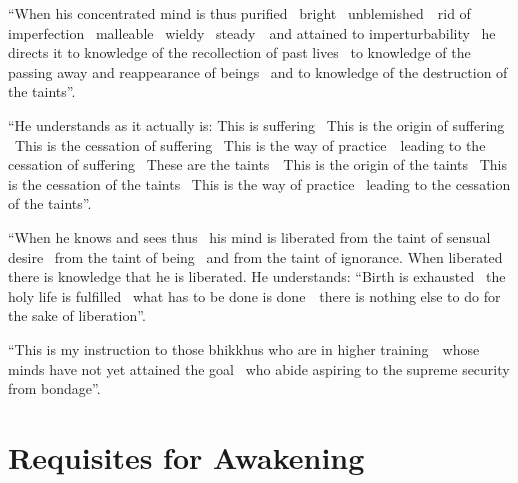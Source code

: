 \begin{english-only-justify}
  ``When his concentrated mind is thus purified \breathmark\ bright \breathmark\ \mbox{unblemished}~\breathmark\ rid of imperfection \breathmark\ malleable \breathmark\ wieldy \breathmark\ \mbox{steady}~\breathmark\ and attained to imperturbability \breathmark\ he directs it to knowledge of the recollection of past lives \breathmark\ to knowledge of the passing away and reappearance of beings \breathmark\ and to knowledge of the destruction of the taints''.
\end{english-only-justify}

\begin{english-only-justify}
  ``He understands as it actually is: This is suffering \breathmark\ This is the origin of suffering \breathmark\ This is the cessation of suffering \breathmark\ This is the way of \mbox{practice}~\breathmark\ leading to the cessation of suffering \breathmark\ These are the \mbox{taints}~\breathmark\ This is the origin of the taints \breathmark\ This is the cessation of the taints \breathmark\ This is the way of practice \breathmark\ leading to the cessation of the taints''.
\end{english-only-justify}

\begin{english-only-justify}
  ``When he knows and sees thus \breathmark\ his mind is liberated from the taint of sensual desire \breathmark\ from the taint of being \breathmark\ and from the taint of ignorance. When liberated there is knowledge that he is liberated. He understands: ``Birth is exhausted \breathmark\ the holy life is fulfilled \breathmark\ what has to be done is \mbox{done}~\breathmark\ there is nothing else to do for the sake of liberation''.
\end{english-only-justify}

\suttaRef{[MN 39]}

\begin{english-only-justify}
  ``This is my instruction to those bhikkhus who are in higher \mbox{training}~\breathmark\ whose minds have not yet attained the goal \breathmark\ who abide aspiring to the supreme security from bondage''.
\end{english-only-justify}

\suttaRef{[MN 107]}

\ifdigitalversion{}\fi



\section{Requisites for Awakening}
\label{requisites-for-awakening}

